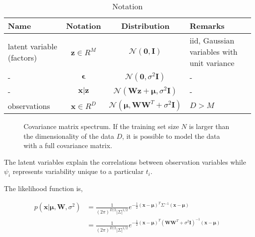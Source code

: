 								\begin{table}[t]
								\centering
								\begin{tabular}{| l | c | c | l |}\hline
								\textbf{Name} & \textbf{Notation} & \textbf{Distribution} & \textbf{Remarks}\\\hline
								latent variable (factors) & $\mathbf{z} \in R^M$ & $ \mathcal{N}(\mathbf{0},\mathbf{I})$ & \parbox{2in}{iid, Gaussian variables with unit variance}\\\hline
								- & $ \mathbf{\epsilon}$ & $ \mathcal{N}(\mathbf{0},\sigma^2\mathbf{I})$ &-\\\hline
								- & $\mathbf{x|z} $ & $ \mathcal{N}(\mathbf{Wz+\mu},\sigma^2\mathbf{I})$ &-\\\hline              
								observations & $\mathbf{x} \in R^D$ & $ \mathcal{N}(\mathbf{\mu},\mathbf{WW}^T + \sigma^2\mathbf{I})$ &$D>M$ \\\hline
								\end{tabular}
								\caption{Notation}
								\end{table}



					                \begin{figure}[t]
					                \centering
					                \caption{Covariance matrix spectrum.  If the training set size $N$ is larger than the dimensionality of the data $D$, it is possible to model the data with a full covariance matrix.} 
					                \label{fig:covariance_matrix_spectrum}
					                \end{figure}

The latent variables explain the correlations between observation variables while $\psi_i$ represents variability unique to a particular $t_i$.




The likelihood function is,

\begin{equation}
\begin{array}{lllll}
p(\mathbf{x}|\mathbf{\mu, W}, \sigma^2) &= \frac{1}{(2\pi)^{D/2}|\Sigma|^{1/2}}e^{-\frac{1}{2}(\mathbf{x}-\mathbf{\mu})^T\Sigma^{-1}(\mathbf{x}-\mathbf{\mu})}\\
&= \frac{1}{(2\pi)^{D/2}|\Sigma|^{1/2}}e^{-\frac{1}{2}(\mathbf{x}-\mathbf{\mu})^T(\mathbf{W}\mathbf{W}^T + \sigma^2 \mathbf{I})^{-1}(\mathbf{x}-\mathbf{\mu})}\\
\end{array}
\end{equation}

